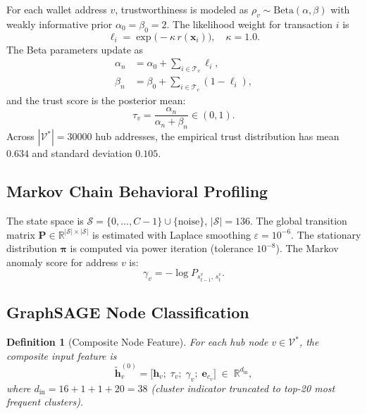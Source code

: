 \documentclass[journal]{IEEEtran}
\newtheorem{definition}{Definition}
\begin{document}
For each wallet address $v$, trustworthiness is modeled as
$\rho_{v}\sim\mathrm{Beta}(\alpha,\beta)$ with weakly informative prior
$\alpha_{0} = \beta_{0} = 2$.  The likelihood weight for transaction $i$ is
\begin{equation}
  \ell_{i} = \exp\!\bigl(-\kappa\,r(\mathbf{x}_{i})\bigr), \quad \kappa = 1.0.
  \label{eq:likelihood}
\end{equation}
The Beta parameters update as
\begin{align}
  \alpha_{n} &= \alpha_{0} + \textstyle\sum_{i\in\mathcal{T}_{v}} \ell_{i},
  \label{eq:alpha_n} \\
  \beta_{n}  &= \beta_{0}  + \textstyle\sum_{i\in\mathcal{T}_{v}} (1 - \ell_{i}),
  \label{eq:beta_n}
\end{align}
and the trust score is the posterior mean:
\begin{equation}
  \tau_{v} = \frac{\alpha_{n}}{\alpha_{n} + \beta_{n}} \in (0,1).
  \label{eq:trust}
\end{equation}
Across $|\mathcal{V}^{*}|=\num{30000}$ hub addresses, the empirical trust
distribution has mean $0.634$ and standard deviation $0.105$.

\subsection{Markov Chain Behavioral Profiling}
\label{subsec:markov_def}

The state space is $\mathcal{S} = \{0,\ldots,C-1\} \cup \{\text{noise}\}$,
$|\mathcal{S}| = 136$.  The global transition matrix
$\mathbf{P}\in\mathbb{R}^{|\mathcal{S}|\times|\mathcal{S}|}$ is estimated with
Laplace smoothing $\varepsilon = 10^{-6}$.  The stationary distribution
$\boldsymbol{\pi}$ is computed via power iteration (tolerance $10^{-8}$).
The Markov anomaly score for address $v$ is:
\begin{equation}
  \gamma_{v} = -\log P_{s_{t-1}^{v},\,s_{t}^{v}}.
  \label{eq:markov_score}
\end{equation}

\subsection{GraphSAGE Node Classification}
\label{subsec:graphsage_def}

\begin{definition}[Composite Node Feature]
For each hub node $v\in\mathcal{V}^{*}$, the composite input feature is
\begin{equation}
  \tilde{\mathbf{h}}_{v}^{(0)}
    = \bigl[
        \mathbf{h}_{v};\;
        \tau_{v};\;
        \gamma_{v};\;
        \mathbf{e}_{c_{v}}
      \bigr]
    \;\in\; \mathbb{R}^{d_{\mathrm{in}}},
  \label{eq:composite}
\end{equation}
where $d_{\mathrm{in}} = 16 + 1 + 1 + 20 = 38$ (cluster indicator truncated to
top-20 most frequent clusters).
\end{definition}
\end{document}
